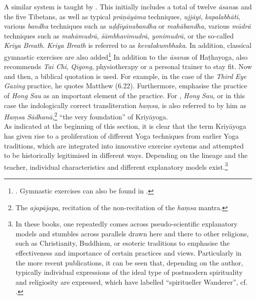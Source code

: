 A similar system is taught by \citeauthor{kriyayogalowenstein}. This initially includes a total of twelve \textit{āsana}s and the five Tibetans, as well as typical \textit{prāṇāyāma} techniques, \textit{ujjāyi}, \textit{kapalabhāti}, various \textit{bandha} techniques such as \textit{uḍḍīyānabandha} or \textit{mahābandha}, various \textit{mūdrā} techniques such as \textit{mahāmudrā}, \textit{śāmbhavīmudrā}, \textit{yonimudrā}, or the so-called \textit{Kriya Breath}. \textit{Kriya Breath} is referred to as \textit{kevalakumbhaka}. In addition, classical gymnastic exercises are also added\footnote{\citeauthor[2021: 118-124]{kriyayogalowenstein}. Gymnastic exercises can also be found in \citeauthor[2015: 447-458]{kriyayogasturgess2015}.} In addition to the \textit{āsana}s of Haṭhayoga, \citeauthor{kriyayogalowenstein} also recommends \textit{Tai Chi}, \textit{Qigong}, physiotherapy or a personal trainer to stay fit. Now and then, a biblical quotation is used. For example, in the case of the \textit{Third Eye Gazing} practice, he quotes Matthew (6.22). Furthermore, \citeauthor{kriyayogalowenstein} emphasise the practice of \textit{Hong Sau} as an important element of the practice. For \citeauthor{kriyayoganityananda2013}, \textit{Hong Sau}, or in this case the indologically correct transliteration \textit{haṃsa}, is also referred to by him as \textit{Haṃsa Sādhanā},\footnote{The \textit{ajapājapa}, recitation of the non-recitation of the \textit{haṃsa} mantra.} ``the very foundation'' of Kriyāyoga.\\

As indicated at the beginning of this section, it is clear that the term Kriyāyoga has given rise to a proliferation of different Yoga techniques from earlier Yoga traditions, which are integrated into innovative exercise systems and attempted to be historically legitimised in different ways. Depending on the lineage and the teacher, individual characteristics and different explanatory models exist.\footnote{In these books, one repeatedly comes across pseudo-scientific explanatory models and stumbles across parallels drawn here and there to other religions, such as Christianity, Buddhism, or esoteric traditions to emphasise the effectiveness and importance of certain practices and views. Particularly in the more recent publications, it can be seen that, depending on the author, typically individual expressions of the ideal type of postmodern spirituality and religiosity are expressed, which \citeauthor{bochinger2009} have labelled ``spiritueller Wanderer'', cf. \citeauthor[2009: 33-49]{bochinger2009}.}\\

